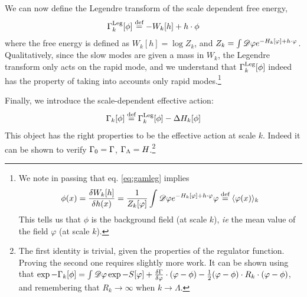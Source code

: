We can now define the Legendre transform of the scale dependent free energy,
\begin{equation}
\label{eq:gamleg}
\Gamma_k^{\text{Leg}}[\phi]  \overset{\text{def}}{=}  - W_k[h] + h \cdot \phi
\end{equation}
where the free energy is defined as $W_k[h] = \log Z_k$, and $Z_k = \int  \mathscr{D}  \varphi e^{-H_k[\varphi] + h \cdot \varphi} $.
Qualitatively, since the slow modes are given a mass in $W_k$, the Legendre transform only acts on the rapid mode, and we understand that  $\Gamma_k^{\text{Leg}}[\phi]$ indeed has the property of taking into accounts only rapid modes.\footnote{We note in passing that eq. \ref{eq:gamleg} implies 
\begin{equation}
\phi(x) = \frac{\delta W_k[h]}{
\delta h(x)} = \frac{1}{Z_k[\varphi]} \int  \mathscr{D}  \varphi e^{-H_k[\varphi] + h \cdot \varphi} \varphi  \overset{\text{def}}{=}  \langle \varphi(x) \rangle_k
\end{equation}
This tells us that $\phi$ is the background field (at scale $k$), \textit{ie} the mean value of the field $\varphi$ (at scale $k$). }

Finally, we introduce the scale-dependent effective action:
\begin{equation}
\Gamma_k[\phi]  \overset{\text{def}}{=}  \Gamma_k^{\text{Leg}}[\phi] - \Delta H_k[\phi]
\end{equation}
This object has the right properties to be the effective action at scale $k$. Indeed it can be shown to verify $\Gamma_0 = \Gamma$, $\Gamma_\Lambda = H$.\footnote{The first identity is trivial, given the properties of the regulator function. Proving the second one requires slightly more work. It can be shown using that $\exp{-\Gamma_k[\phi]} = \int  \mathscr{D}  \varphi \exp{-S[\varphi] + \frac{\delta \Gamma}{\delta \varphi} \cdot (\varphi - \phi) - \frac{1}{2} (\varphi - \phi ) \cdot R_k \cdot (\varphi - \phi) }$, and remembering that $R_k \rightarrow \infty$ when $k \rightarrow \Lambda$.}


